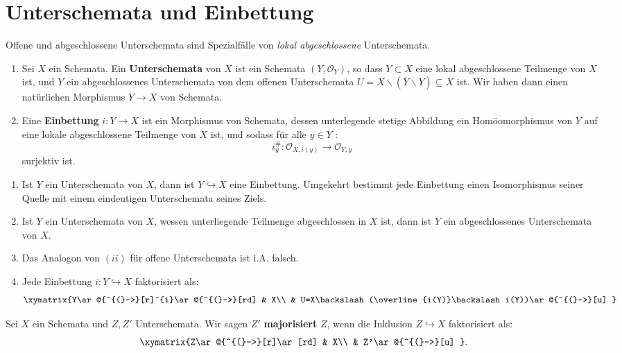 \section{Unterschemata und Einbettung}

Offene und abgeschlossene Unterschemata sind Spezialfälle von \emph{lokal
  abgeschlossene} Unterschemata.
\begin{defn}[37]
  \mbox{}
  \begin{enumerate}
  \item Sei $X$ ein Schemata. Ein \textbf{Unterschemata} von $X$ ist ein
    Schemata $(Y,\mathcal{O}_{Y})$, so dass $Y\subset X$ eine lokal
    abgeschlossene Teilmenge von $X$ ist, und $Y$ ein abgeschlossenes
    Unterschemata von dem offenen Unterschemata $U=X\backslash(\overline{Y}\backslash Y)\subseteq X$
    ist. Wir haben dann einen natürlichen Morphismus $Y\rightarrow X$
    von Schemata.
  \item Eine \textbf{Einbettung} $i:Y\rightarrow X$ ist ein Morphismus von
    Schemata, dessen unterlegende stetige Abbildung ein Homöomorphismus
    von $Y$ auf eine lokale abgeschlossene Teilmenge von $X$ ist, und
    sodass für alle $y\in Y$ : 
    \[
      i_{y}^{\#}:\mathcal{O}_{X,i(y)}\rightarrow\mathcal{O}_{Y,y}
    \]
    surjektiv ist.
  \end{enumerate}
\end{defn}

\begin{rem}[38]
  \mbox{}
  \begin{enumerate}
  \item Ist $Y$ ein Unterschemata von $X$, dann ist $Y\hookrightarrow X$
    eine Einbettung. Umgekehrt bestimmt jede Einbettung einen Isomorphismus
    seiner Quelle mit einem eindeutigen Unterschemata seines Ziels.
  \item Ist $Y$ ein Unterschemata von $X$, wessen unterliegende Teilmenge
    abgeschlossen in $X$ ist, dann ist $Y$ ein abgeschlossenes Unterschemata
    von $X$.
  \item Das Analogon von $(ii)$ für offene Unterschemata ist i.A. falsch.
  \item Jede Einbettung $i:Y\hookrightarrow X$ faktorisiert als:
    \[
      \xymatrix{Y\ar@{^{(}->}[r]^{i}\ar@{^{(}->}[rd] & X\\
        & U=X\backslash(\overline{i(Y)}\backslash i(Y))\ar@{^{(}->}[u]
      }
    \]
  \end{enumerate}
\end{rem}

\begin{defn}[39]
  Sei $X$ ein Schemata und $Z,Z'$ Unterschemata. Wir sagen $Z'$
  \textbf{majorisiert} $Z$, wenn die Inklusion $Z\hookrightarrow X$
  faktorisiert als:
  \[
    \xymatrix{Z\ar@{^{(}->}[r]\ar[rd] & X\\
      & Z'\ar@{^{(}->}[u]
    }
    .
  \]
\end{defn}

